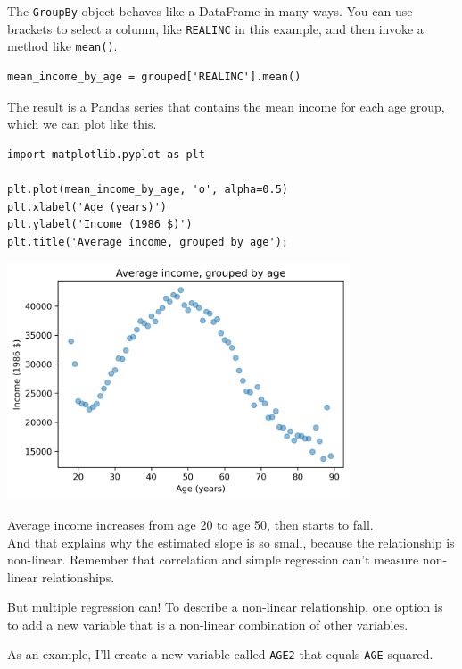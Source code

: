 The \passthrough{\lstinline!GroupBy!} object behaves like a DataFrame in
many ways. You can use brackets to select a column, like
\passthrough{\lstinline!REALINC!} in this example, and then invoke a
method like \passthrough{\lstinline!mean()!}.

\begin{lstlisting}[]
mean_income_by_age = grouped['REALINC'].mean()
\end{lstlisting}

The result is a Pandas series that contains the mean income for each age
group, which we can plot like this.

\begin{lstlisting}[]
import matplotlib.pyplot as plt

plt.plot(mean_income_by_age, 'o', alpha=0.5)
plt.xlabel('Age (years)')
plt.ylabel('Income (1986 $)')
plt.title('Average income, grouped by age');
\end{lstlisting}

\begin{center}
\includegraphics[width=4in]{10_regression_files/10_regression_36_0.png}
\end{center}

Average income increases from age 20 to age 50, then starts to fall.\\
And that explains why the estimated slope is so small, because the
relationship is non-linear. Remember that correlation and simple
regression can't measure non-linear relationships.

But multiple regression can! To describe a non-linear relationship, one
option is to add a new variable that is a non-linear combination of
other variables.

As an example, I'll create a new variable called
\passthrough{\lstinline!AGE2!} that equals \passthrough{\lstinline!AGE!}
squared.

